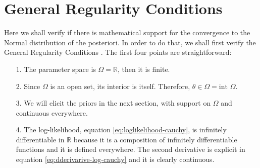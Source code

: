 \documentclass[a4paper,10pt, notitlepage]{report}
\theoremstyle{plain}
\newcommand{\R}{\mathbb{R}}
\begin{document}
\section*{General Regularity Conditions}

Here we shall verify if there is mathematical support for the convergence to
the Normal distribution of the posteriori. In order to do that, we shall first
verify the General Regularity Conditions \cite[Page 436]{schervish1996theory}.
The first four points are straightforward: 

\begin{enumerate}
    \item[1.] The parameter space is $\Omega = \R$, then it is finite.  
    \item[2.] Since $\Omega$ is an open set, its interior is itself.
    Therefore, $\theta \in \Omega = \text{int } \Omega$.   
    \item[3.] We will elicit the priors in the next section, with support
    on $\Omega$ and continuous everywhere.
    \item[4.] The log-likelihood, equation \ref{eq:loglikelihood-cauchy}, 
    is infinitely differentiable in $\R$ because it is a composition of
    infinitely differentiable functions and it is defined everywhere. The
    second derivative is explicit in equation
    \ref{eq:dderivarive-log-cauchy} and it is clearly continuous. 
\end{enumerate}
\end{document}
